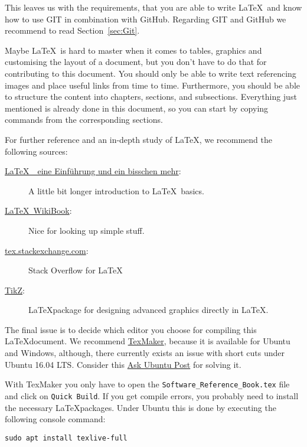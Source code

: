 This leaves us with the requirements, that you are able to write \LaTeX\ and know how to use GIT in combination with GitHub. Regarding GIT and GitHub we recommend to read Section~\ref{sec:Git}. 

Maybe \LaTeX\ is hard to master when it comes to tables, graphics and customising the layout of a document, but you don't have to do that for contributing to this document. You should only be able to write text referencing images and place useful links from time to time. Furthermore, you should be able to structure the content into chapters, sections, and subsections. Everything just mentioned is already done in this document, so you can start by copying commands from the corresponding sections. 

For further reference and an in-depth study of \LaTeX, we recommend the following sources:

\begin{description}
  \item[\href{http://www.wiwiss.fu-berlin.de/fachbereich/vwl/iso/links/latex_einfuehrung_manuela_juergens.pdf}{\LaTeX\ \textendash\ eine Einf\"uhrung und ein bisschen mehr}:] A little bit longer introduction to \LaTeX\ basics.
  \item[\href{https://en.wikibooks.org/wiki/LaTeX}{\LaTeX\ WikiBook}:] Nice for looking up simple stuff. 
  \item[\href{https://tex.stackexchange.com}{tex.stackexchange.com}:] Stack Overflow for \LaTeX
  \item[\href{http://ftp.fau.de/ctan/graphics/pgf/base/doc/pgfmanual.pdf}{TikZ}:] \LaTeX package for designing advanced graphics directly in \LaTeX.
\end{description}

The final issue is to decide which editor you choose for compiling this \LaTeX document. We recommend \href{http://www.xm1math.net/texmaker/}{TexMaker}, because it is available for Ubuntu and Windows, although, there currently exists an issue with short cuts under Ubuntu 16.04 LTS. Consider this \href{http://askubuntu.com/questions/786280/texmaker-shortcuts-not-working-on-ubuntu-16-04}{Ask Ubuntu Post} for solving it.

With TexMaker you only have to open the \verb#Software_Reference_Book.tex# file and click on \verb#Quick Build#. If you get compile errors, you probably need to install the necessary \LaTeX packages. Under Ubuntu this is done by executing the following console command:

\verb#sudo apt install texlive-full#

